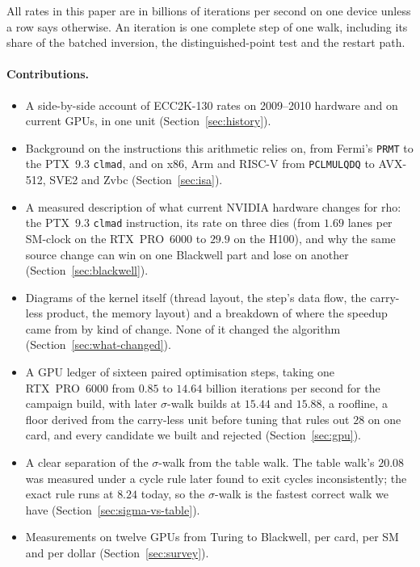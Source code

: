 All rates in this paper are in billions of iterations per second on
one device unless a row says otherwise. An iteration is one complete
step of one walk, including its share of the batched inversion, the
distinguished-point test and the restart path.

\paragraph{Contributions.}
\begin{itemize}[leftmargin=1.2em,itemsep=0.3em]
\item A side-by-side account of ECC2K-130 rates on 2009--2010 hardware
  and on current GPUs, in one unit (Section~\ref{sec:history}).
\item Background on the instructions this arithmetic relies on, from
  Fermi's \texttt{PRMT} to the PTX~9.3 \texttt{clmad}, and on x86, Arm and
  RISC-V from \texttt{PCLMULQDQ} to AVX-512, SVE2 and Zvbc
  (Section~\ref{sec:isa}).
\item A measured description of what current NVIDIA hardware changes
  for rho: the PTX~9.3 \texttt{clmad} instruction, its rate on three
  dies (from $1.69$ lanes per SM-clock on the RTX~PRO~6000 to $29.9$ on
  the H100), and why the same source change can win on one Blackwell
  part and lose on another (Section~\ref{sec:blackwell}).
\item Diagrams of the kernel itself (thread layout, the step's data
  flow, the carry-less product, the memory layout) and a breakdown of
  where the speedup came from by kind of change. None of it changed the
  algorithm (Section~\ref{sec:what-changed}).
\item A GPU ledger of sixteen paired optimisation steps, taking one
  RTX~PRO~6000 from $0.85$ to $14.64$ billion iterations per second for
  the campaign build, with later $\sigma$-walk builds at $15.44$ and
  $15.88$, a roofline, a floor derived from the carry-less unit before
  tuning that rules out $28$ on one card, and every candidate we built
  and rejected (Section~\ref{sec:gpu}).
\item A clear separation of the $\sigma$-walk from the table walk. The
  table walk's $20.08$ was measured under a cycle rule later found to
  exit cycles inconsistently; the exact rule runs at $8.24$ today, so
  the $\sigma$-walk is the fastest correct walk we have
  (Section~\ref{sec:sigma-vs-table}).
\item Measurements on twelve GPUs from Turing to Blackwell, per card,
  per SM and per dollar (Section~\ref{sec:survey}).

\end{itemize}
